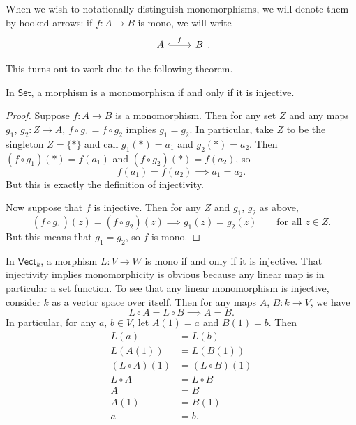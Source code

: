 \documentclass[main.tex]{subfiles}
\begin{document}
\begin{note}
  When we wish to notationally distinguish monomorphisms, we will denote them by hooked arrows: if $f\colon A \to B$ is mono, we will write
  \begin{equation*}
    \begin{tikzcd}
      A
      \arrow[r, hookrightarrow, "f"]
      & B
    \end{tikzcd}.
  \end{equation*}
\end{note}

This turns out to work due to the following theorem.

\begin{theorem}
  In $\mathsf{Set}$, a morphism is a monomorphism if and only if it is injective.
\end{theorem}
\begin{proof}
  Suppose $f\colon A \to B$ is a monomorphism. Then for any set $Z$ and any maps $g_{1}$, $g_{2}\colon Z \to A$, $f \circ g_{1} = f \circ g_{2}$ implies $g_{1} = g_{2}$. In particular, take $Z$ to be the singleton $Z = \{*\}$ and call $g_{1}(*) = a_{1}$ and $g_{2}(*) = a_{2}$. Then $(f \circ g_{1})(*) = f(a_{1})$ and $(f \circ g_{2})(*) = f(a_{2})$, so
  \begin{equation*}
    f(a_{1}) = f(a_{2}) \implies a_{1} = a_{2}.
  \end{equation*}
  But this is exactly the definition of injectivity.

  Now suppose that $f$ is injective. Then for any $Z$ and $g_{1}$, $g_{2}$ as above,
  \begin{equation*}
    (f \circ g_{1})(z) = (f \circ g_{2})(z) \implies g_{1}(z) = g_{2}(z)\qquad\text{for all } z \in Z.
  \end{equation*}
  But this means that $g_{1} = g_{2}$, so $f$ is mono.
\end{proof}

\begin{example}
  \label{eg:monomorphismsinkvect}
  In $\mathsf{Vect}_{k}$, a morphism $L\colon V \to W$ is mono if and only if it is injective. That injectivity implies monomorphicity is obvious because any linear map is in particular a set function. To see that any linear monomorphism is injective, consider $k$ as a vector space over itself. Then for any maps $A$, $B\colon k \to V$, we have
  \begin{equation*}
    L \circ A = L \circ B \implies A = B.
  \end{equation*}
  In particular, for any $a$, $b \in V$, let $A(1) = a$ and $B(1) = b$. Then
  \begin{align*}
    L(a) &= L(b) \\
    L(A(1)) &= L(B(1)) \\
    (L \circ A)(1) &= (L \circ B)(1) \\
    L \circ A &= L \circ B \\
    A &= B \\
    A(1) &= B(1) \\
    a &= b.
  \end{align*}
\end{example}
\end{document}
